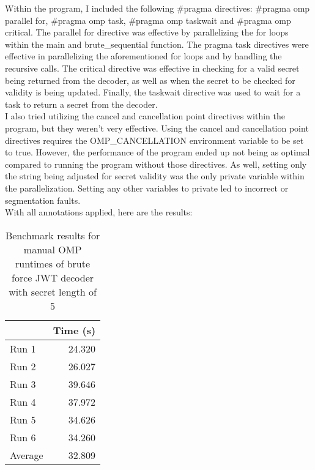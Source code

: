 \documentclass[12pt]{article}
\begin{document}
Within the program, I included the following \#pragma directives: \#pragma omp parallel for, \#pragma omp task, \#pragma omp taskwait and \#pragma omp critical. The parallel for directive was effective by parallelizing the for loops within the main and brute\_sequential function. The pragma task directives were effective in parallelizing the aforementioned for loops and by handling the recursive calls. The critical directive was effective in checking for a valid secret being returned from the decoder, as well as when the secret to be checked for validity is being updated. Finally, the taskwait directive was used to wait for a task to return a secret from the decoder. 
\\
I also tried utilizing the cancel and cancellation point directives within the program, but they weren't very effective. Using the cancel and cancellation point directives requires the OMP\_CANCELLATION environment variable to be set to true. However, the performance of the program ended up not being as optimal compared to running the program without those directives. As well, setting only the string being adjusted for secret validity was the only private variable within the parallelization. Setting any other variables to private led to incorrect or segmentation faults. 
\\
With all annotations applied, here are the results:

\begin{table}[H]
  \centering
  \begin{tabular}{lr}
    & {\bf Time (s)} \\
    \hline
    Run 1 & 24.320 \\
    Run 2 & 26.027 \\
    Run 3 & 39.646 \\
    Run 4 & 37.972 \\
    Run 5 & 34.626 \\
    Run 6 & 34.260 \\
    \hline
    Average & 32.809 \\
  \end{tabular}
  \caption{\label{tbl-zeta-openmp}Benchmark results for manual OMP runtimes of brute force JWT decoder with secret length of 5}
\end{table}
\end{document}
